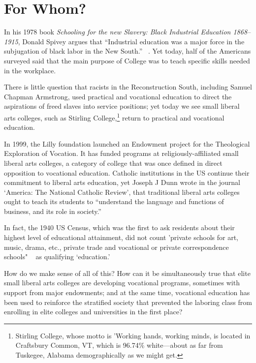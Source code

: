 \section{For Whom?}
\label{forwhom}


In his 1978 book \emph{Schooling for the new Slavery: Black Industrial Education 1868--1915}, Donald Spivey argues that ``Industrial education was a major force in the subjugation of black labor in the New South.'' ~\citep[P. IX]{Spivey:1978un}. Yet today, half of the Americans surveyed said that the main purpose of College was to teach specific skills needed in the workplace. ~\citep{PewResearchCenter:2016ut} 

There is little question that racists in the Reconstruction South, including Samuel Chapman Armstrong, used practical and vocational education to direct the aspirations of freed slaves into service positions; yet today we see small liberal arts colleges, such as Stirling College,\footnote{Stirling College, whose motto is 'Working hands, working minds, is located in Craftsbury Common, VT, which is 96.74\% white---about as far from Tuskegee, Alabama demographically as we might get.} return to practical and vocational education.

In 1999, the Lilly foundation launched an Endowment project for the Theological Exploration of Vocation. It has funded programs at religiously-affiliated small liberal arts colleges, a category of college that was once defined in direct opposition to vocational education. Catholic institutions in the US continue their commitment to liberal arts education, yet Joseph J Dunn wrote in the journal `America: The National Catholic Review', that traditional liberal arts colleges ought to teach its students to ``understand the language and functions of business, and its role in society.'' ~\citep{Dunn:2016vz}

In fact, the 1940 US Census, which was the first to ask residents about their highest level of educational attainment, did not count 'private schools for art, music, drama, etc., private trade and vocational or private correspondence schools" ~\citep[p. 118]{Harriman:1947wh} as qualifying `education.'

How do we make sense of all of this? How can it be simultaneously true that elite small liberal arts colleges are developing vocational programs, sometimes with support from major endowments; and at the same time, vocational education has been used to reinforce the stratified society that prevented the laboring class from enrolling in elite colleges and universities in the first place? 

